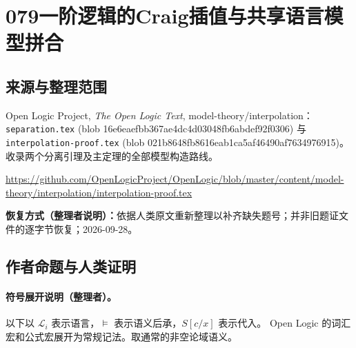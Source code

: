 \documentclass[UTF8,11pt]{ctexart}
\theoremstyle{definition}
\begin{document}
\section*{079\quad 一阶逻辑的Craig插值与共享语言模型拼合}
\subsection*{来源与整理范围}
Open Logic Project, \emph{The Open Logic Text}, model-theory/interpolation：\texttt{separation.tex} (blob 16e6eaefbb367ae4dc4d03048fb6abdef92f0306) 与 \texttt{interpolation-proof.tex} (blob 021b8648fb8616eab1ca5af46490af7634976915)。收录两个分离引理及主定理的全部模型构造路线。
\par\url{https://github.com/OpenLogicProject/OpenLogic/blob/master/content/model-theory/interpolation/interpolation-proof.tex}
\par\textbf{恢复方式（整理者说明）：}依据人类原文重新整理以补齐缺失题号；并非旧题证文件的逐字节恢复；2026-09-28。
\subsection*{作者命题与人类证明}

\paragraph{符号展开说明（整理者）。}
以下以 $\mathcal L_i$ 表示语言，$\models$ 表示语义后承，$S[c/x]$ 表示代入。
Open Logic 的词汇宏和公式宏展开为常规记法。取通常的非空论域语义。
\end{document}
